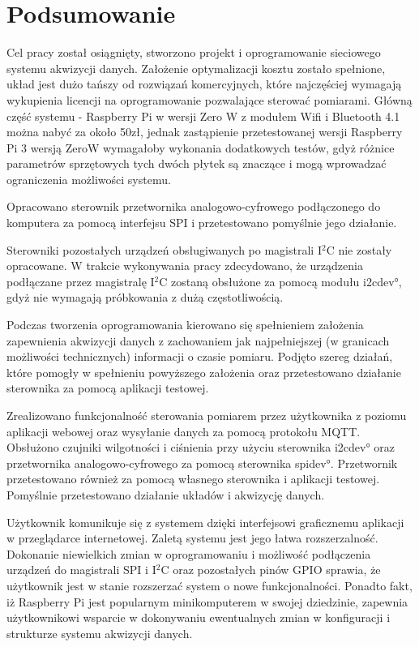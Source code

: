 \chapter{Podsumowanie}
\label{ch:podsumowanie}


Cel pracy został osiągnięty, stworzono projekt i oprogramowanie sieciowego systemu akwizycji danych. Założenie optymalizacji kosztu zostało spełnione, układ jest dużo tańszy od rozwiązań komercyjnych, które najczęściej wymagają wykupienia licencji na oprogramowanie pozwalające sterować pomiarami. Główną część systemu - Raspberry Pi w wersji Zero W z modułem Wifi i Bluetooth 4.1 można nabyć za około 50zł, jednak zastąpienie przetestowanej wersji Raspberry Pi 3 wersją ZeroW wymagałoby wykonania dodatkowych testów, gdyż różnice parametrów sprzętowych tych dwóch płytek są znaczące i mogą wprowadzać ograniczenia możliwości systemu.

Opracowano sterownik przetwornika analogowo-cyfrowego podłączonego do komputera za pomocą interfejsu SPI i przetestowano pomyślnie jego działanie.

Sterowniki pozostałych urządzeń obsługiwanych po magistrali I$^2$C nie zostały opracowane.
W trakcie wykonywania pracy zdecydowano, że urządzenia podłączane przez magistralę I$^2$C zostaną obsłużone za pomocą modułu \ang{i2cdev}, gdyż nie wymagają próbkowania z dużą częstotliwością.
 
Podczas tworzenia oprogramowania kierowano się spełnieniem założenia zapewnienia akwizycji danych z zachowaniem jak najpełniejszej (w granicach możliwości technicznych) informacji o czasie pomiaru. Podjęto szereg działań, które pomogły w spełnieniu powyższego założenia oraz przetestowano działanie sterownika za pomocą aplikacji testowej. 

 Zrealizowano funkcjonalność sterowania pomiarem przez użytkownika z poziomu aplikacji webowej oraz wysyłanie danych za pomocą protokołu MQTT. Obsłużono czujniki wilgotności i ciśnienia przy użyciu sterownika \ang{i2cdev} oraz przetwornika analogowo-cyfrowego za pomocą sterownika \ang{spidev}. Przetwornik przetestowano również za pomocą własnego sterownika i aplikacji testowej. Pomyślnie przetestowano działanie układów i akwizycję danych. 

Użytkownik komunikuje się z systemem dzięki interfejsowi graficznemu aplikacji w przeglądarce internetowej. Zaletą systemu jest jego łatwa rozszerzalność. Dokonanie niewielkich zmian w oprogramowaniu i możliwość podłączenia urządzeń do magistrali SPI i I$^2$C oraz pozostałych pinów GPIO sprawia, że użytkownik jest w stanie rozszerzać system o nowe funkcjonalności. Ponadto fakt, iż Raspberry Pi jest popularnym minikomputerem w swojej dziedzinie, zapewnia użytkownikowi wsparcie w dokonywaniu ewentualnych zmian w konfiguracji i strukturze systemu akwizycji danych. 

